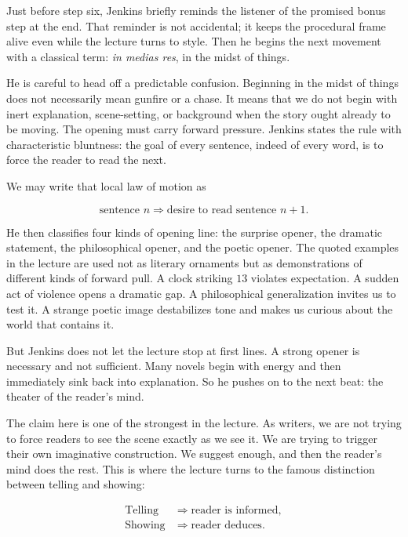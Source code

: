 Just before step six, Jenkins briefly reminds the listener of the promised bonus step at the end. That reminder is not accidental; it keeps the procedural frame alive even while the lecture turns to style. Then he begins the next movement with a classical term: \emph{in medias res}, in the midst of things.

He is careful to head off a predictable confusion. Beginning in the midst of things does not necessarily mean gunfire or a chase. It means that we do not begin with inert explanation, scene-setting, or background when the story ought already to be moving. The opening must carry forward pressure. Jenkins states the rule with characteristic bluntness: the goal of every sentence, indeed of every word, is to force the reader to read the next.

We may write that local law of motion as

\begin{equation}
\text{sentence } n \Rightarrow \text{desire to read sentence } n+1.
\end{equation}

He then classifies four kinds of opening line: the surprise opener, the dramatic statement, the philosophical opener, and the poetic opener. The quoted examples in the lecture are used not as literary ornaments but as demonstrations of different kinds of forward pull. A clock striking \(13\) violates expectation. A sudden act of violence opens a dramatic gap. A philosophical generalization invites us to test it. A strange poetic image destabilizes tone and makes us curious about the world that contains it.

But Jenkins does not let the lecture stop at first lines. A strong opener is necessary and not sufficient. Many novels begin with energy and then immediately sink back into explanation. So he pushes on to the next beat: the theater of the reader's mind.

The claim here is one of the strongest in the lecture. As writers, we are not trying to force readers to see the scene exactly as we see it. We are trying to trigger their own imaginative construction. We suggest enough, and then the reader's mind does the rest. This is where the lecture turns to the famous distinction between telling and showing:

\begin{equation}
\begin{aligned}
\text{Telling} &\Rightarrow \text{reader is informed},\\
\text{Showing} &\Rightarrow \text{reader deduces}.
\end{aligned}
\end{equation}

